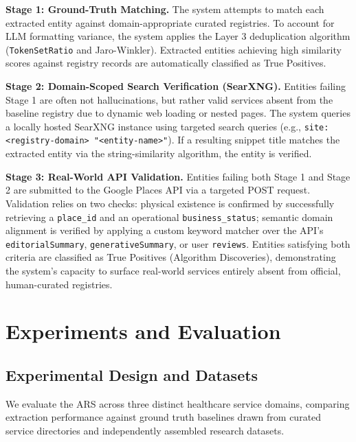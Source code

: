 \documentclass[12pt,oneside]{report}
\begin{document}
\textbf{Stage 1: Ground-Truth Matching.} The system attempts to match each extracted entity against domain-appropriate curated registries. To account for LLM formatting variance, the system applies the Layer 3 deduplication algorithm (\texttt{TokenSetRatio} and Jaro-Winkler). Extracted entities achieving high similarity scores against registry records are automatically classified as True Positives.

\textbf{Stage 2: Domain-Scoped Search Verification (SearXNG).} Entities failing Stage 1 are often not hallucinations, but rather valid services absent from the baseline registry due to dynamic web loading or nested pages. The system queries a locally hosted SearXNG instance using targeted search queries (e.g., \texttt{site:<registry-domain> "<entity-name>"}). If a resulting snippet title matches the extracted entity via the string-similarity algorithm, the entity is verified.

\textbf{Stage 3: Real-World API Validation.} Entities failing both Stage 1 and Stage 2 are submitted to the Google Places API via a targeted POST request. Validation relies on two checks: physical existence is confirmed by successfully retrieving a \texttt{place\_id} and an operational \texttt{business\_status}; semantic domain alignment is verified by applying a custom keyword matcher over the API's \texttt{editorialSummary}, \texttt{generativeSummary}, or user \texttt{reviews}. Entities satisfying both criteria are classified as True Positives (Algorithm Discoveries), demonstrating the system's capacity to surface real-world services entirely absent from official, human-curated registries.


\section{Experiments and Evaluation}
\subsection{Experimental Design and Datasets}
We evaluate the ARS across three distinct healthcare service domains, comparing extraction performance against ground truth baselines drawn from curated service directories and independently assembled research datasets.
\end{document}
